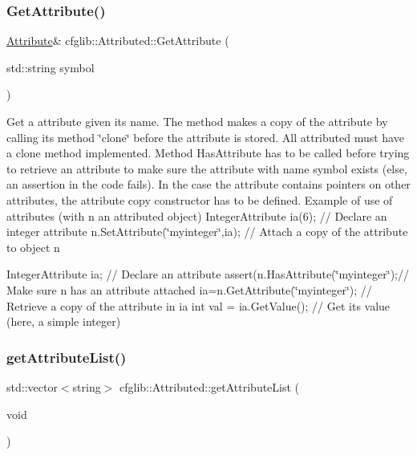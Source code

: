 \subsubsection{\texorpdfstring{Get\+Attribute()}{GetAttribute()}}
{\footnotesize\ttfamily \hyperlink{classcfglib_1_1Attribute}{Attribute}\& cfglib\+::\+Attributed\+::\+Get\+Attribute (\begin{DoxyParamCaption}\item[{std\+::string}]{symbol }\end{DoxyParamCaption})}

Get a attribute given its name. The method makes a copy of the attribute by calling its method \char`\"{}clone\char`\"{} before the attribute is stored. All attributed must have a \textquotesingle{}clone\textquotesingle{} method implemented. Method Has\+Attribute has to be called before trying to retrieve an attribute to make sure the attribute with name \textquotesingle{}symbol\textquotesingle{} exists (else, an assertion in the code fails). In the case the attribute contains pointers on other attributes, the attribute copy constructor has to be defined. Example of use of attributes (with n an attributed object) Integer\+Attribute ia(6); // Declare an integer attribute n.\+Set\+Attribute(\char`\"{}myinteger\char`\"{},ia); // Attach a copy of the attribute to object n

Integer\+Attribute ia; // Declare an attribute assert(n.\+Has\+Attribute(\char`\"{}myinteger\char`\"{});// Make sure n has an attribute attached ia=n.\+Get\+Attribute(\char`\"{}myinteger\char`\"{}); // Retrieve a copy of the attribute in ia int val = ia.\+Get\+Value(); // Get it\textquotesingle{}s value (here, a simple integer) \mbox{\label{classcfglib_1_1Attributed_ab61bf9157b32995f4b0dfcc61cc0b35b}} 
\subsubsection{\texorpdfstring{get\+Attribute\+List()}{getAttributeList()}}
{\footnotesize\ttfamily std\+::vector$<$string$>$ cfglib\+::\+Attributed\+::get\+Attribute\+List (\begin{DoxyParamCaption}\item[{void}]{ }\end{DoxyParamCaption})}

